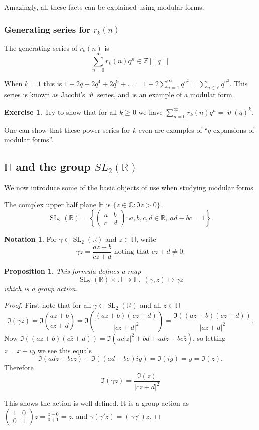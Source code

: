 \documentclass{article}
\newtheorem*{prop}{Proposition}
\theoremstyle{definition}
\newtheorem*{exer}{Exercise}
\newtheorem*{nota}{Notation}
\DeclareMathOperator{\SL}{SL}
\begin{document}
Amazingly, all these facts can be explained using modular forms.

\subsubsection{Generating series for $r_k(n)$}
The generating series of $r_k(n)$ is 
\[\sum_{n=0}^{\infty}r_k(n) q^n \in \mathbb{Z}[[q]]\]

When $k=1$ this is $1 + 2q + 2q^4 + 2q^9 + \ldots = 1 + 2\sum_{n=1}^{\infty}q^{n^2} = \sum_{n\in \mathbb{Z}} q^{n^2}$.
This series is known as Jacobi's $\upvartheta$ series, and is an example of a modular form.

\begin{exer}
Try to show that for all $k \ge 0$ we have $\sum_{n=0}^{\infty}r_k(n)q^n = \upvartheta(q)^k$.

One can show that these power series for $k$ even are examples of ``$q$-expansions of modular forms''.
\end{exer}

\subsection{$\mathbb{H}$ and the group $SL_2(\mathbb{R})$} %

We now introduce some of the basic objects of use when studying modular forms.

The complex upper half plane $\mathbb{H}$ is $\{z\in \mathbb{C} \colon \Im z > 0\}$.
\[\SL_2(\mathbb{R}) =\left\{\begin{pmatrix} a & b\\c&d\end{pmatrix} \colon a,b,c,d\in\mathbb{R},\ ad-bc = 1\right\}.\]

\begin{nota}
For $\gamma\in\SL_2(\mathbb{R})$ and $z\in \mathbb{H}$, write
\[ \gamma z = \frac{az+b}{cz+d} \text{ noting that } cz+d \ne 0.\]
\end{nota}

\begin{prop}
This formula defines a map
\[
\SL_2(\mathbb{R})\times \mathbb{H} \to \mathbb{H},\ (\gamma,z)\mapsto\gamma z
\]
which is a group action.
\end{prop}

\begin{proof}
First note that for all $\gamma \in \SL_2(\mathbb{R})$ and all $z\in \mathbb{H}$
\[\Im(\gamma z) = \Im\left(\frac{az+b}{cz+d}\right) = \Im\left(\frac{(az+b)(c{\bar z} + d)}{|cz+d|^2}\right) = \frac{\Im((az+b)(c{\bar z} +d))}{|az+d|^2}.\]
Now $\Im((az+b)(c{\bar z} + d)) = \Im(ac|z|^2 + bd + adz + bc{\bar z})$, so letting $z= x+iy$ we see this equals
\[\Im(adz + bc{\bar z}) + \Im((ad-bc)iy) = \Im(iy) = y = \Im(z).\]
Therefore
\[\Im(\gamma z) = \frac{\Im(z)}{|cz+d|^2}\]

This shows the action is well defined.
It is a group action as $\begin{pmatrix}1&0\\0&1\end{pmatrix}z = \frac{z+0}{0+1} = z$, and $\gamma(\gamma'z) = (\gamma\gamma')z$.
\end{proof}
\end{document}
